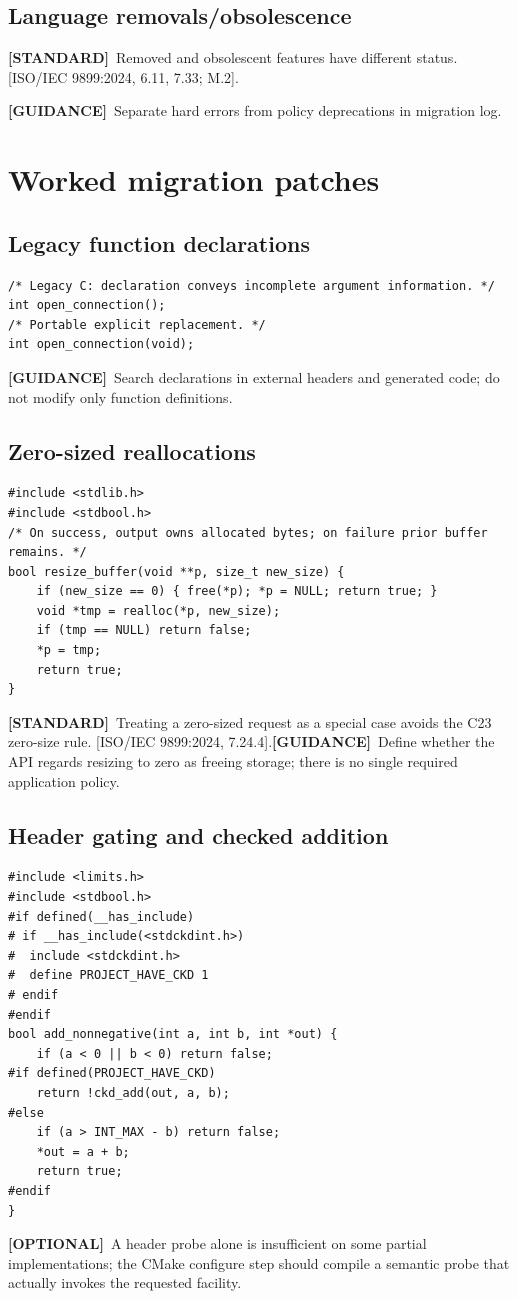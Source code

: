 \documentclass[10pt,letterpaper,oneside]{report}
\newcommand{\refcl}[1]{\textsf{\footnotesize[ISO/IEC 9899:2024, #1]}}
\newcommand{\standard}{\textbf{[STANDARD]}}
\newcommand{\optional}{\textbf{[OPTIONAL]}}
\newcommand{\guidance}{\textbf{[GUIDANCE]}}
\begin{document}
\section{Language removals/obsolescence}
\standard\ Removed and obsolescent features have different status. \refcl{6.11, 7.33; M.2}.\par\guidance\ Separate hard errors from policy deprecations in migration log.

\chapter{Worked migration patches}
\section{Legacy function declarations}
\begin{lstlisting}
/* Legacy C: declaration conveys incomplete argument information. */
int open_connection();
/* Portable explicit replacement. */
int open_connection(void);
\end{lstlisting}
\guidance\ Search declarations in external headers and generated code; do not modify only function definitions.
\section{Zero-sized reallocations}
\begin{lstlisting}
#include <stdlib.h>
#include <stdbool.h>
/* On success, output owns allocated bytes; on failure prior buffer remains. */
bool resize_buffer(void **p, size_t new_size) {
    if (new_size == 0) { free(*p); *p = NULL; return true; }
    void *tmp = realloc(*p, new_size);
    if (tmp == NULL) return false;
    *p = tmp;
    return true;
}
\end{lstlisting}
\standard\ Treating a zero-sized request as a special case avoids the C23 zero-size rule. \refcl{7.24.4}.\guidance\ Define whether the API regards resizing to zero as freeing storage; there is no single required application policy.
\section{Header gating and checked addition}
\begin{lstlisting}
#include <limits.h>
#include <stdbool.h>
#if defined(__has_include)
# if __has_include(<stdckdint.h>)
#  include <stdckdint.h>
#  define PROJECT_HAVE_CKD 1
# endif
#endif
bool add_nonnegative(int a, int b, int *out) {
    if (a < 0 || b < 0) return false;
#if defined(PROJECT_HAVE_CKD)
    return !ckd_add(out, a, b);
#else
    if (a > INT_MAX - b) return false;
    *out = a + b;
    return true;
#endif
}
\end{lstlisting}
\optional\ A header probe alone is insufficient on some partial implementations; the CMake configure step should compile a semantic probe that actually invokes the requested facility.
\end{document}
